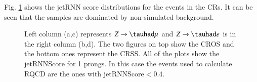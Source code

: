 Fig. \ref{Fig12} shows the jetRNN score distributions for the events in the CRs. It can be seen that the samples are dominated by non-simulated background.

\begin{figure}[htbp]
	\centering
	\hfill
	\caption{Left column (a,c) represents $Z\to\tauhad\mu$ and $Z\to\tauhad e$ is in the right column (b,d). The two figures on top show the CROS and the bottom ones represent the CRSS. All of the plots show the jetRNNScore for 1 prongs. In this case the events used to calculate RQCD are the ones with jetRNNScore$<0.4$.  }
	\label{Fig12}
\end{figure}

